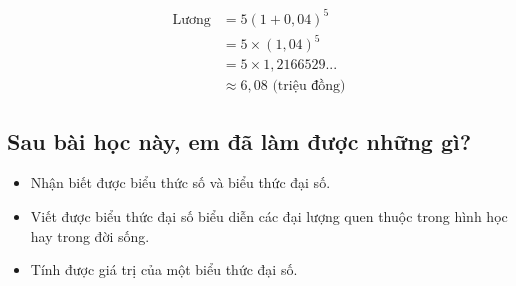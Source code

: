 \documentclass[
]{article}
\providecommand{\tightlist}{%
  \setlength{\itemsep}{0pt}\setlength{\parskip}{0pt}}
\begin{document}
\begin{align*}
\text{Lương} &= 5(1 + 0{,}04)^5 \\
&= 5 \times (1{,}04)^5 \\
&= 5 \times 1{,}2166529... \\
&\approx 6{,}08 \text{ (triệu đồng)}
\end{align*}

\subsection{Sau bài học này, em đã làm được những
gì?}\label{sau-buxe0i-hux1ecdc-nuxe0y-em-ux111uxe3-luxe0m-ux111ux1b0ux1ee3c-nhux1eefng-guxec}

\begin{itemize}
\tightlist
\item
  Nhận biết được biểu thức số và biểu thức đại số.
\item
  Viết được biểu thức đại số biểu diễn các đại lượng quen thuộc trong
  hình học hay trong đời sống.
\item
  Tính được giá trị của một biểu thức đại số.
\end{itemize}
\end{document}
